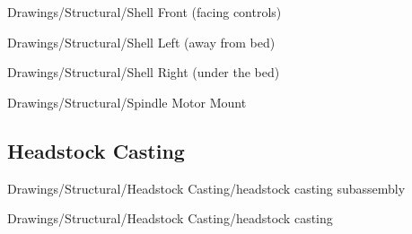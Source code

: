 
{Drawings/Structural/Shell Front (facing controls)}


{Drawings/Structural/Shell Left (away from bed)}


{Drawings/Structural/Shell Right (under the bed)}


{Drawings/Structural/Spindle Motor Mount}

\subsection{Headstock Casting}


{Drawings/Structural/Headstock Casting/headstock casting subassembly}


{Drawings/Structural/Headstock Casting/headstock casting}

